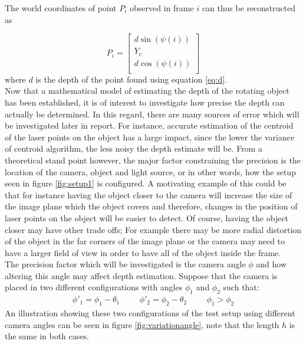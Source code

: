 The world coordinates of point $P_{i}$ observed in frame $i$ can thus be reconstructed as

\begin{equation}
    P_{i} =  \begin{bmatrix}
    d \sin(\psi(i)) \\
    Y_{c} \\
    d \cos(\psi(i))  \\
    \end{bmatrix}
\end{equation}
where $d$ is the depth of the point found using equation \ref{eq:d}.\\

Now that a mathematical model of estimating the depth of the rotating object has been established, it is of interest to investigate how precise the depth can actually be determined. In this regard, there are many sources of error which will be investigated later in report. For instance, accurate estimation of the centroid of the laser points on the object has a large impact, since the lower the variance of centroid algorithm, the less noisy the depth estimate will be. From a theoretical stand point however, the major factor constraining the precision is the location of the camera, object and light source, or in other words, how the setup seen in figure \ref{fig:setup1} is configured. A motivating example of this could be that for instance having the object closer to the camera will increase the size of the image plane which the object covers and therefore, changes in the position of laser points on the object will be easier to detect. Of course, having the object closer may have other trade offs; For example there may be more radial distortion of the object in the far corners of the image plane or the camera may need to have a larger field of view in order to have all of the object inside the frame.\\

The precision factor which will be investigated is the camera angle $\phi$ and how altering this angle may affect depth estimation. Suppose that the camera is placed in two different configurations with angles $\phi_{1}$ and $\phi_{2}$ such that: 
\begin{equation}
\begin{split}
    \phi'_{1} = \phi_{1} - \theta_{1} \hspace{1cm}
    \phi'_{2} = \phi_{2} - \theta_{2} \hspace{1cm}
    \phi_{1} > \phi_{2}
\end{split}
\end{equation}
An illustration showing these two configurations of the test setup using different camera angles can be seen in figure \ref{fig:variationangle}, note that the length $h$ is the same in both cases.\\


